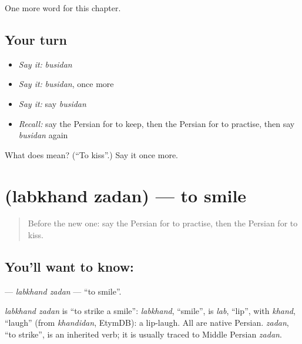\begin{grammarlens}[title={What you've built}]
One more word for this chapter.
\end{grammarlens}

\subsection*{Your turn}
\begin{itemize}
\raggedright
  \item \emph{Say it:} \emph{busidan}
  \item \emph{Say it:} \emph{busidan}, once more
  \item \emph{Say it:} say \emph{busidan}
  \item \emph{Recall:} say the Persian for to keep, then the Persian for to practise, then say \emph{busidan} again
\end{itemize}

\begin{tcolorbox}[breakable,colback=teal!4,colframe=teal!35!black,title={Before you move on}]
What does  mean? (\textquotedblleft{}To kiss\textquotedblright{}.) Say it once more.
\end{tcolorbox}
\section[\texorpdfstring{\fa{لبخند} \fa{زدن} (labkhand zadan)}{لبخند زدن (labkhand zadan)}]{  (labkhand zadan) — to smile}

\label{lesson:FA-C219-labkhand-zadan}



\begin{quote}
Before the new one: say the Persian for to practise, then the Persian for to kiss.
\end{quote}

\subsection*{You'll want to know:  }
\textbf{ } — \emph{labkhand zadan} — \textquotedblleft{}to smile\textquotedblright{}.

\begin{cousinweb}
\emph{labkhand zadan} is \textquotedblleft{}to strike a smile\textquotedblright{}: \emph{labkhand}, \textquotedblleft{}smile\textquotedblright{}, is \emph{lab}, \textquotedblleft{}lip\textquotedblright{}, with \emph{khand}, \textquotedblleft{}laugh\textquotedblright{} (from \emph{khandidan}, EtymDB): a lip-laugh. All are native Persian. \emph{zadan}, \textquotedblleft{}to strike\textquotedblright{}, is an inherited verb; it is usually traced to Middle Persian \emph{zadan}.
\end{cousinweb}

